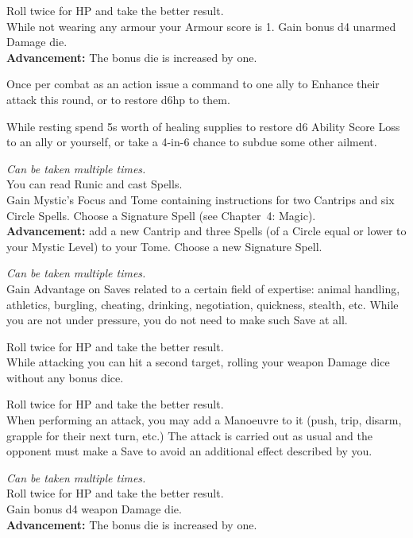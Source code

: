 \documentclass[itdr]{subfiles}
\begin{document}
 Roll twice for HP and take the better result.\\
While not wearing any armour your Armour score is 1. Gain bonus d4 unarmed Damage die.\\
\textbf{Advancement:} The bonus die is increased by one.

Once per combat as an action issue a command to one ally to Enhance their attack this round, or to restore d6hp to them.

While resting spend 5s worth of healing supplies to restore d6 Ability Score Loss to an ally or yourself, or take a 4-in-6 chance to subdue some other ailment.

 {\slshape Can be taken multiple times.}\\
You can read Runic and cast Spells.\\
Gain Mystic's Focus and Tome containing instructions for two Cantrips and six  Circle Spells. Choose a Signature Spell (see Chapter~4: Magic).\\
\textbf{Advancement:} add a new Cantrip and three Spells (of a Circle equal or lower to your Mystic Level) to your Tome. Choose a new Signature Spell.

 {\slshape Can be taken multiple times.}\\
Gain Advantage on Saves related to a certain field of expertise: animal handling, athletics, burgling, cheating, drinking, negotiation, quickness, stealth, etc. While you are not under pressure, you do not need to make such Save at all.

 Roll twice for HP and take the better result.\\
While attacking you can hit a second target, rolling your weapon Damage dice without any bonus dice.

 Roll twice for HP and take the better result.\\
When performing an attack, you may add a Manoeuvre to it (push, trip, disarm, grapple for their next turn, etc.) The attack is carried out as usual and the opponent must make a Save to avoid an additional effect described by you.

 {\slshape Can be taken multiple times.}\\
Roll twice for HP and take the better result.\\
Gain bonus d4 weapon Damage die.\\
\textbf{Advancement:} The bonus die is increased by one.
\end{document}
